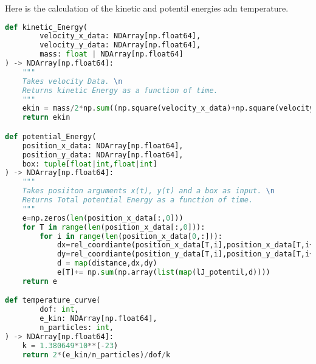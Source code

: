 \documentclass{article}
\begin{document}
Here is the calculation of the kinetic and potentil energies adn temperature.
\begin{lstlisting}[language=Python, caption={This is how the energies were analyzed and calculated}]
def kinetic_Energy(
        velocity_x_data: NDArray[np.float64],
        velocity_y_data: NDArray[np.float64],
        mass: float | NDArray[np.float64]
) -> NDArray[np.float64]:  
    """
    Takes velocity Data. \n
    Returns kinetic Energy as a function of time.
    """
    ekin = mass/2*np.sum((np.square(velocity_x_data)+np.square(velocity_y_data)),1)
    return ekin

def potential_Energy(
    position_x_data: NDArray[np.float64],
    position_y_data: NDArray[np.float64],
    box: tuple[float|int,float|int]
) -> NDArray[np.float64]:
    """
    Takes posiiton arguments x(t), y(t) and a box as input. \n
    Returns Total potential Energy as a function of time.
    """
    e=np.zeros(len(position_x_data[:,0]))
    for T in range(len(position_x_data[:,0])):
        for i in range(len(position_x_data[0,:])):
            dx=rel_coordiante(position_x_data[T,i],position_x_data[T,i+1:len(position_x_data[1])],box[0])
            dy=rel_coordiante(position_y_data[T,i],position_y_data[T,i+1:len(position_y_data[1])],box[1])
            d = map(distance,dx,dy)
            e[T]+= np.sum(np.array(list(map(lJ_potentil,d))))
    return e

def temperature_curve(  
        dof: int,  
        e_kin: NDArray[np.float64],
        n_particles: int,
) -> NDArray[np.float64]:
    k = 1.380649*10**(-23)  
    return 2*(e_kin/n_particles)/dof/k
\end{lstlisting}
\end{document}
